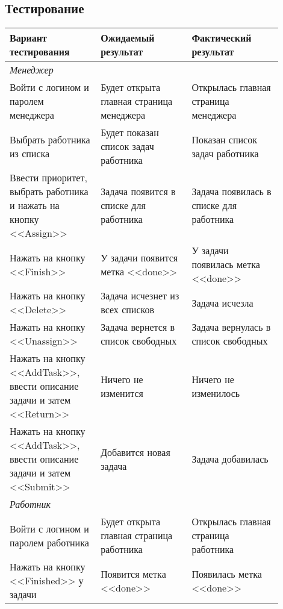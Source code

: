 \subsection{Тестирование}
\begin{center}
	\begin{longtable}{|p{0.3\linewidth}|p{0.3\linewidth}|p{0.3\linewidth}|}
		\hline
		\textbf{Вариант тестирования} & \textbf{Ожидаемый результат}&
		\textbf{Фактический результат}\\
		\hline
		\multicolumn{3}{|p{0.3\linewidth}|}{\textit{Менеджер}} \\
		\hline
		Войти с логином и паролем менеджера & Будет открыта главная страница менеджера & Открылась главная страница менеджера  \\
		\hline
		Выбрать работника из списка & Будет показан список задач работника & Показан список задач работника \\
		\hline
	Ввести приоритет, выбрать работника и нажать на кнопку <<Assign>> & Задача появится в списке для работника& 
		Задача появилась в списке для работника\\
		\hline
		Нажать на кнопку <<Finish>> 
		&У задачи появится метка <<done>>& У задачи появилась метка <<done>> \\
		\hline
		Нажать на кнопку <<Delete>>
		&Задача исчезнет из всех списков & Задача исчезла \\
		\hline
		Нажать на кнопку <<Unassign>> 
		&Задача вернется в список свободных & Задача вернулась в список свободных\\
		\hline
		Нажать на кнопку <<AddTask>>, ввести описание задачи и затем <<Return>>
		&Ничего не изменится &Ничего не изменилось\\
		\hline
		Нажать на кнопку <<AddTask>>, ввести описание задачи и затем <<Submit>>
		&Добавится новая задача &Задача добавилась\\
		\hline
		\multicolumn{3}{|p{0.3\linewidth}|}{\textit{Работник}} \\
		\hline
		\hline
		Войти с логином и паролем работника & Будет открыта главная страница работника & Открылась главная страница работника  \\
		\hline
		Нажать на кнопку <<Finished>> у задачи& Появится метка <<done>> &Появилась метка <<done>>\\	
		\hline
	\end{longtable}
\end{center}